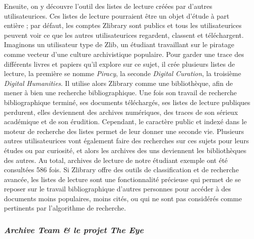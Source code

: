 Ensuite, on y découvre l'outil des listes de lecture créées par d'autres utilisateurices. Ces listes de lecture pourraient être un objet d'étude à part entière ; par défaut, les comptes Zlibrary sont publics et tous les utilisateurices peuvent voir ce que les autres utilisateurices regardent, classent et téléchargent. Imaginons un utilisateur type de Zlib, un étudiant travaillant sur le piratage comme vecteur d'une culture archivistique populaire. Pour garder une trace des différents livres et papiers qu'il explore sur ce sujet, il crée plusieurs listes de lecture, la première se nomme \textit{Piracy}, la seconde \textit{Digital Curation}, la troisième \textit{Digital Humanities}. Il utilise alors Zlibrary comme une bibliothèque, afin de mener à bien une recherche bibliographique. Une fois son travail de recherche bibliographique terminé, ses documents téléchargés, ses listes de lecture publiques perdurent, elles deviennent des archives numériques, des traces de son sérieux académique et de son érudition. Cependant, le caractère public et indexé dans le moteur de recherche des listes permet de leur donner une seconde vie. Plusieurs autres utilisateurices vont également faire des recherches sur ces sujets pour leurs études ou par curiosité, et alors les archives des uns deviennent les bibliothèques des autres. Au total, archives de lecture de notre étudiant exemple ont été consultées 586 fois. Si Zlibrary offre des outils de classification et de recherche avancée, les listes de lecture sont une fonctionnalité précieuse qui permet de se reposer sur le travail bibliographique d'autres personnes pour accéder à des documents moins populaires, moins cités, ou qui ne sont pas considérés comme pertinents par l'algorithme de recherche.\\

\subsubsection*{\textit{Archive Team \& le projet The Eye}}

